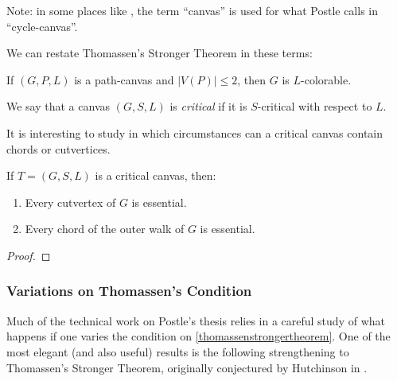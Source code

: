 Note: in some places like \cite{fivelistcoloring2}, the term ``canvas'' is used for what Postle calls in \cite{postlethesis} ``cycle-canvas''.

We can restate Thomassen's Stronger Theorem in these terms:

\begin{theorem}
If $(G, P, L)$ is a path-canvas and $|V(P)| \leq 2$, then $G$ is $L$-colorable.
\end{theorem}

\begin{definition}
We say that a canvas $(G, S, L)$ is \emph{critical} if it is $S$-critical with respect to $L$.
\end{definition}

It is interesting to study in which circumstances can a critical canvas contain chords or cutvertices.


\begin{definition}

\end{definition}

\begin{lemma}
	If $T = (G, S, L)$ is a critical canvas, then:

	\begin{enumerate}
		\item Every cutvertex of $G$ is essential.
		\item Every chord of the outer walk of $G$ is essential.
	\end{enumerate}
\end{lemma}

\begin{proof}

\end{proof}



\subsubsection{Variations on Thomassen's Condition}

Much of the technical work on Postle's thesis relies in a careful study of what happens if one varies the condition on \ref{thomassenstrongertheorem}. One of the most elegant (and also useful) results is the following strengthening to Thomassen's Stronger Theorem, originally conjectured by Hutchinson in \cite{hutchinson2012outerplanar}.

